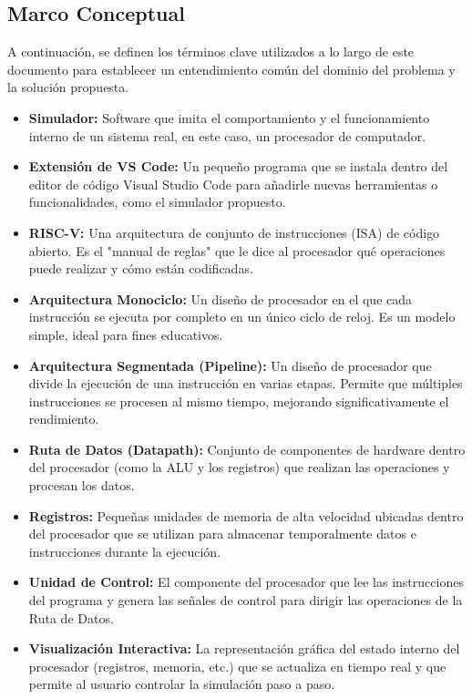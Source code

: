 \documentclass[12pt, letterpaper]{article}
\begin{document}
\subsection{Marco Conceptual}
A continuación, se definen los términos clave utilizados a lo largo de este documento para establecer un entendimiento común del dominio del problema y la solución propuesta.
\begin{itemize}
    \item \textbf{Simulador:} Software que imita el comportamiento y el funcionamiento interno de un sistema real, en este caso, un procesador de computador.
    \item \textbf{Extensión de VS Code:} Un pequeño programa que se instala dentro del editor de código Visual Studio Code para añadirle nuevas herramientas o funcionalidades, como el simulador propuesto.
    \item \textbf{RISC-V:} Una arquitectura de conjunto de instrucciones (ISA) de código abierto. Es el "manual de reglas" que le dice al procesador qué operaciones puede realizar y cómo están codificadas.
    \item \textbf{Arquitectura Monociclo:} Un diseño de procesador en el que cada instrucción se ejecuta por completo en un único ciclo de reloj. Es un modelo simple, ideal para fines educativos.
    \item \textbf{Arquitectura Segmentada (Pipeline):} Un diseño de procesador que divide la ejecución de una instrucción en varias etapas. Permite que múltiples instrucciones se procesen al mismo tiempo, mejorando significativamente el rendimiento.
    \item \textbf{Ruta de Datos (Datapath):} Conjunto de componentes de hardware dentro del procesador (como la ALU y los registros) que realizan las operaciones y procesan los datos.
    \item \textbf{Registros:} Pequeñas unidades de memoria de alta velocidad ubicadas dentro del procesador que se utilizan para almacenar temporalmente datos e instrucciones durante la ejecución.
    \item \textbf{Unidad de Control:} El componente del procesador que lee las instrucciones del programa y genera las señales de control para dirigir las operaciones de la Ruta de Datos.
    \item \textbf{Visualización Interactiva:} La representación gráfica del estado interno del procesador (registros, memoria, etc.) que se actualiza en tiempo real y que permite al usuario controlar la simulación paso a paso.
\end{itemize}

\newpage

\end{document}
